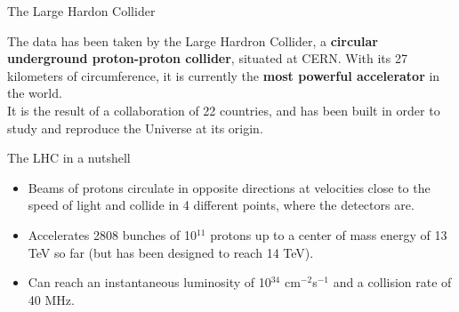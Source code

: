 \documentclass[handout,8 pt]{beamer}
\begin{document}
\begin{frame}{The Large Hardon Collider}

	\begin{minipage}[c]{.49\linewidth}
   	\end{minipage} \hfill
   	\begin{minipage}[c]{.49\linewidth}
	\justifying
	The data has been taken by the Large Hardron Collider, a \textbf{circular underground proton-proton collider}, situated at CERN. With its 27 kilometers of circumference, it is currently the \textbf{most powerful accelerator} in the world. \\ \vspace{10pt}
	It is the result of a collaboration of 22 countries, and has been built in order to study and reproduce the Universe at its origin. \vfill
   	\end{minipage} \hfill \vfill	

	\begin{block}{\vspace{5pt} The LHC in a nutshell}
	\begin{itemize}
	\justifying
	\vspace{5pt}
	\item Beams of protons circulate in opposite directions at velocities close to the speed of light and collide in 4 different points, where the detectors are. \\ \vspace{3pt}
	\item Accelerates 2808 bunches of 10$^{11}$ protons up to a center of mass energy of 13 TeV so far (but has been designed to reach 14 TeV). \\ \vspace{3pt}
	\item Can reach an instantaneous luminosity of 10$^{34}$ cm$^{-2}$s$^{-1}$ and a collision rate of 40 MHz.\\ \vspace{5pt}
	\end{itemize}
	\end{block} \vfill
	
\end{frame}
\end{document}
